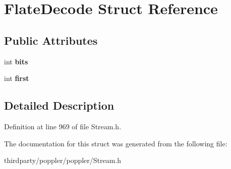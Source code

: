 \hypertarget{struct_flate_decode}{}\section{Flate\+Decode Struct Reference}
\label{struct_flate_decode}
\subsection*{Public Attributes}
\begin{DoxyCompactItemize}
\item 
\mbox{\label{struct_flate_decode_a3fb95f2dd4e21d4a71d8a0604972205e}} 
int {\bfseries bits}
\item 
\mbox{\label{struct_flate_decode_a575b826f9bd35ffc05642c02c67efd06}} 
int {\bfseries first}
\end{DoxyCompactItemize}


\subsection{Detailed Description}


Definition at line 969 of file Stream.\+h.



The documentation for this struct was generated from the following file\+:\begin{DoxyCompactItemize}
\item 
thirdparty/poppler/poppler/Stream.\+h\end{DoxyCompactItemize}
